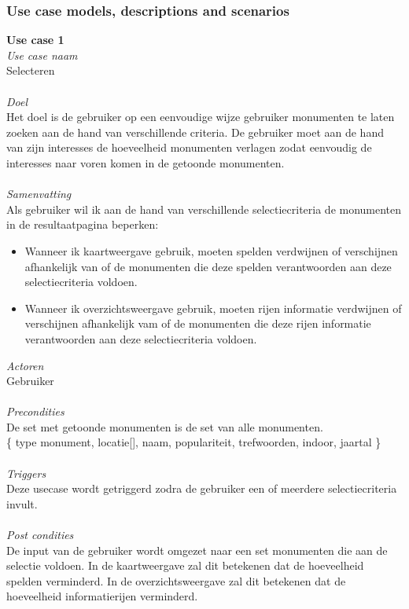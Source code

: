 \documentclass[a4paper,10pt]{article}
\begin{document}
		\subsubsection{Use case models, descriptions and scenarios}
			\textbf{Use case 1}\\
			\textit{Use case naam}\\
			Selecteren\\ \\
			\textit{Doel}\\
			Het doel is de gebruiker op een eenvoudige wijze gebruiker monumenten te laten zoeken aan de hand van verschillende criteria. De gebruiker moet aan de hand van zijn interesses de hoeveelheid monumenten verlagen zodat eenvoudig de interesses naar voren komen in de getoonde monumenten.\\ \\
			\textit{Samenvatting}\\
			Als gebruiker wil ik aan de hand van verschillende selectiecriteria de monumenten in de resultaatpagina beperken:
			\begin{itemize}
				\item Wanneer ik kaartweergave gebruik, moeten spelden verdwijnen of verschijnen afhankelijk van of de monumenten die deze spelden verantwoorden aan deze selectiecriteria voldoen.
				\item Wanneer ik overzichtsweergave gebruik, moeten rijen informatie verdwijnen of verschijnen afhankelijk vam of de monumenten die deze rijen informatie verantwoorden aan deze selectiecriteria voldoen.
			\end{itemize}
			\textit{Actoren}\\
			Gebruiker\\ \\
			\textit{Precondities}\\
			De set met getoonde monumenten is de set van alle monumenten.\\
			\{ type monument, locatie[], naam, populariteit, trefwoorden, indoor, jaartal \} \\ \\
			\textit{Triggers}\\
			Deze usecase wordt getriggerd zodra de gebruiker een of meerdere selectiecriteria invult.\\ \\
			\textit{Post condities}\\			
			De input van de gebruiker wordt omgezet naar een set monumenten die aan de selectie voldoen. In de kaartweergave zal dit betekenen dat de hoeveelheid spelden verminderd. In de overzichtsweergave zal dit betekenen dat de hoeveelheid informatierijen verminderd.\\ \\			
\end{document}
